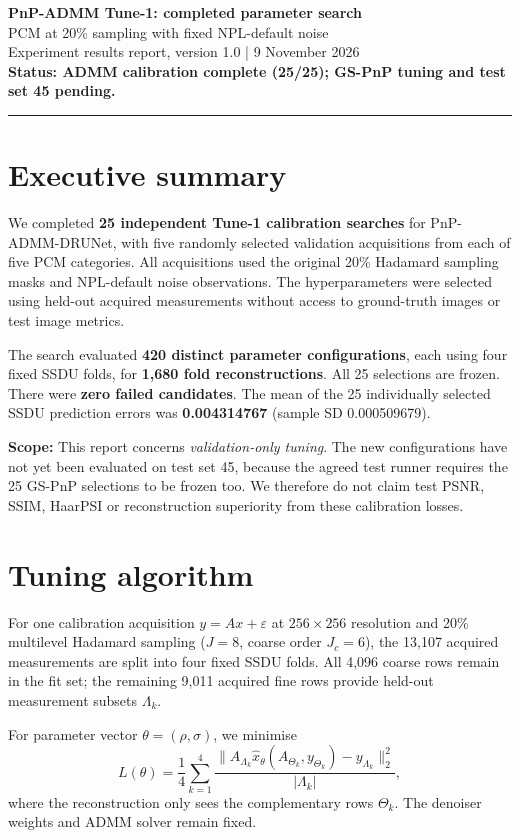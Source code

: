 \documentclass[10pt,a4paper]{article}
\begin{document}
{\LARGE\bfseries\color{ink} PnP-ADMM Tune-1: completed parameter search}\\[5pt]
{\large PCM at 20\% sampling with fixed NPL-default noise}\\[4pt]
{\color{gray} Experiment results report, version 1.0 | 9 November 2026}\\[4pt]
\textbf{Status: ADMM calibration complete (25/25); GS-PnP tuning and test set 45 pending.}
\par\medskip\hrule

\section{Executive summary}

We completed \textbf{25 independent Tune-1 calibration searches} for
PnP-ADMM-DRUNet, with five randomly selected validation acquisitions
from each of five PCM categories. All acquisitions used the original
20\% Hadamard sampling masks and NPL-default noise observations.
The hyperparameters were selected using held-out acquired measurements
without access to ground-truth images or test image metrics.

The search evaluated \textbf{420 distinct parameter configurations},
each using four fixed SSDU folds, for \textbf{1,680 fold reconstructions}.
All 25 selections are frozen. There were \textbf{zero failed candidates}.
The mean of the 25 individually selected SSDU prediction errors was
\textbf{0.004314767} (sample SD 0.000509679).

\textbf{Scope:} This report concerns \emph{validation-only tuning}.
The new configurations have not yet been evaluated on test set 45,
because the agreed test runner requires the 25 GS-PnP selections to be
frozen too. We therefore do not claim test PSNR, SSIM, HaarPSI or
reconstruction superiority from these calibration losses.

\section{Tuning algorithm}

For one calibration acquisition $y=Ax+\varepsilon$ at
$256\times256$ resolution and 20\% multilevel Hadamard sampling
($J=8$, coarse order $J_c=6$), the 13,107 acquired measurements
are split into four fixed SSDU folds. All 4,096 coarse rows remain
in the fit set; the remaining 9,011 acquired fine rows provide
held-out measurement subsets $\Lambda_k$.

For parameter vector $\theta=(\rho,\sigma)$, we minimise
\[
L(\theta)=\frac14\sum_{k=1}^{4}
\frac{\|A_{\Lambda_k}\widehat x_\theta(A_{\Theta_k},y_{\Theta_k})
-y_{\Lambda_k}\|_2^2}{|\Lambda_k|},
\]
where the reconstruction only sees the complementary rows $\Theta_k$.
The denoiser weights and ADMM solver remain fixed.
\end{document}
